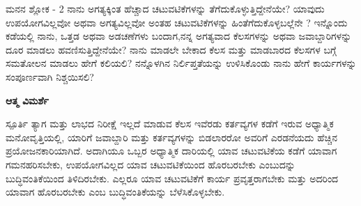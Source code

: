 
\newpage
\begin{mananam}{\mananamfont ಮನನ ಶ್ಲೋಕ - \textenglish{2}}
\footnotesize \mananamtext ನಾನು ಅಗತ್ಯಕ್ಕಿಂತ ಹೆಚ್ಚಾದ ಚಟುವಟಿಕೆಗಳನ್ನು ತೆಗೆದುಕೊಳ್ಳುತ್ತಿದ್ದೇನೆಯೇ? ಯಾವುದು ಉಪಯೋಗವಿಲ್ಲವೋ ಅಥವಾ ಅಗತ್ಯವಿಲ್ಲವೋ ಅಂತಹ ಚಟುವಟಿಕೆಗಳನ್ನು ಹಿಂತೆಗೆದುಕೊಳ್ಳಬಲ್ಲೆನೇ ? ಇನ್ನೊಂದು ಕಡೆಯಲ್ಲಿ ನಾನು, ಒತ್ತಡ ಅಥವಾ ಅಡಚಣೆಗಳು ಬಂದಾಗ,ನನ್ನ ಅಗತ್ಯವಾದ ಕೆಲಸಗಳನ್ನು ಅಥವಾ ಜವಾಬ್ದಾರಿಗಳನ್ನು ದೂರ ಮಾಡಲು ಹವಣಿಸುತ್ತಿದ್ದೇನೆಯೇ? ನಾನು ಮಾಡಲೇ  ಬೇಕಾದ ಕೆಲಸ ಮತ್ತು ಮಾಡಬಾರದ ಕೆಲಸಗಳ ಬಗ್ಗೆ ಸಮತೋಲನ ಮಾಡಲು ಹೇಗೆ ಕಲಿಯಲಿ? ನನ್ನೊಳಗಿನ ನಿರ್ಲಿಪ್ತತೆಯನ್ನು ಉಳಿಸಿಕೊಂಡು ನಾನು ಹೇಗೆ ಕಾರ್ಯಗಳನ್ನು ಸಂಪೂರ್ಣವಾಗಿ ನಿಶ್ಚಯಿಸಲಿ?
\end{mananam}
\WritingHand\enspace\textbf{ಆತ್ಮ ವಿಮರ್ಶೆ}\\
\begin{inspiration}{\mananamfont ಸ್ಪೂರ್ತಿ}
\footnotesize \mananamtext ತ್ಯಾಗ ಮತ್ತು ಲಾಭದ ನಿರೀಕ್ಷೆ ಇಲ್ಲದೆ ಮಾಡುವ ಕೆಲಸ ಇವೆರಡು ಕರ್ತವ್ಯಗಳ ಕಡೆಗೆ ಇರುವ ಅಧ್ಯಾತ್ಮಿಕ ಮನೋವೃತ್ತಿಯಲ್ಲಿ, ಯಾರಿಗೆ ಜವಾಬ್ದಾರಿ ಮತ್ತು ಕರ್ತವ್ಯಗಳನ್ನು ಬಿಡಲಾರರೋ ಅವರಿಗೆ ಎರಡನೆಯದು ಹೆಚ್ಚಿನ ಪ್ರಯೋಜನಕಾರಿಯಾಗಿದೆ. ಅದಾಗಿಯೂ ಒಬ್ಬರ ಅಧ್ಯಾತ್ಮಿಕ ದಾರಿಯಲ್ಲಿ ಯಾವ ಚಟುವಟಿಕೆಯ ಕಡೆಗೆ ಯಾವಾಗ ಗಮನಹರಿಸಬೇಕು, ಉಪಯೋಗವಿಲ್ಲದ ಯಾವ ಚಟುವಟಿಕೆಯಿಂದ ಹೊರಬರಬೇಕು ಎಂಬುದನ್ನು ಬುದ್ಧಿವಂತಿಕೆಯಿಂದ ತಿಳಿದಿರಬೇಕು. ಎಲ್ಲರೂ ಯಾವ ಚಟುವಟಿಕೆಗೆ ಕಾರ್ಯ ಪ್ರವೃತ್ತರಾಗಬೇಕು ಮತ್ತು ಅದರಿಂದ ಯಾವಾಗ ಹೊರಬರಬೇಕು ಎಂಬ ಬುದ್ಧಿವಂತಿಕೆಯನ್ನು ಬೆಳೆಸಿಕೊಳ್ಳಬೇಕು.
\end{inspiration}
\newpage

